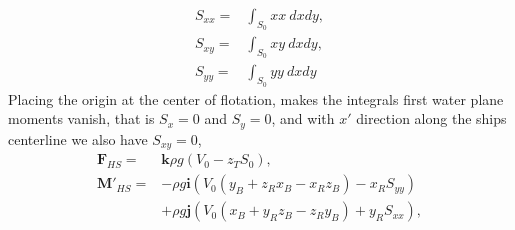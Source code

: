 \documentclass[]{book}
\newcommand{\V}[1]{\boldsymbol{#1}}
\begin{document}
\begin{align}
S_{xx} =& \int_{S_0} xx ~dxdy, \\
S_{xy} =& \int_{S_0} xy ~dxdy, \\
S_{yy} =& \int_{S_0} yy ~dxdy 
\end{align}
Placing the origin at the center of flotation, makes the integrals first water plane moments vanish, that is $S_x=0$ and $S_y=0$, and with $x'$ direction along the ships centerline we also have $S_{xy} = 0$,
\begin{align}
	\V{F}_{HS}=& \V{k} \rho g\left( V_0 
	- z_T S_0\right),  \\
		\V{M}'_{HS} =&
		-\rho g\V{i}\left(    
			V_0 (y_B
		+  z_R x_B
		-  x_R z_B )
		-  x_R S_{yy} \right) \nonumber \\ 
		& + \rho g \V{j} \left(  
			V_0 (x_B
		+ y_R  z_B
		- z_R  y_B)
		+ y_R S_{xx} \right),
		\end{align}	
\end{document}
